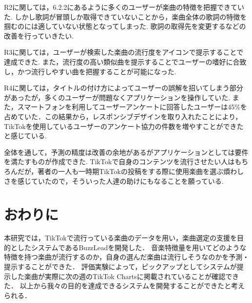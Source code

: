 \documentclass[titlepage]{jsreport}
\begin{document}
R2に関しては，6.2.2にあるように多くのユーザーが楽曲の特徴を把握できていた.
しかし歌詞が冒頭しか取得できていないことから，楽曲全体の歌詞の特徴を掴むのには適していない状態となってしまった. 
歌詞の取得先を変更するなどの改善を行っていきたい.

R3に関しては，ユーザーが検索した楽曲の流行度をアイコンで提示することで達成できた.
また，流行度の高い類似曲を提示することでユーザーの嗜好に合致し，かつ流行しやすい曲を把握することが可能になった.

R4に関しては，タイトルの付け方によってユーザーの誤解を招いてしまう部分があったが，多くのユーザーが問題なくアプリケーションを操作していた. 
また，スマートフォンを利用してユーザーアンケートに回答したユーザーは45\%を占めていた．この結果から，レスポンシブデザインを取り入れたことにより，TikTokを使用しているユーザーのアンケート協力の件数を増やすことができたと感じている.

全体を通して，予測の精度は改善の余地があるがアプリケーションとしては要件を満たすものが作成できた.
TikTokで自身のコンテンツを流行させたい人はもちろんだが，著者の一人も一時期TikTokの投稿をする際に使用楽曲を選ぶ煩わしさを感じていたので，そういった人達の助けにもなることを願っている.


\chapter{おわりに}
本研究では，TikTokで流行っている楽曲のデータを用い，楽曲選定の支援を目的としたシステムであるBuzzLeadを開発した．
音楽特徴量を用いてどのような特徴を持つ楽曲が流行するのか，自身の選んだ楽曲は流行しそうなのかを予測・提示することができた．
評価実験によって，ピックアップとしてシステムが提示した楽曲が実際に次の週のTikTok Chartsに掲載されていることが確認できた．
以上から我々の目的を達成できるシステムを開発することができたと考えられる．
\end{document}
